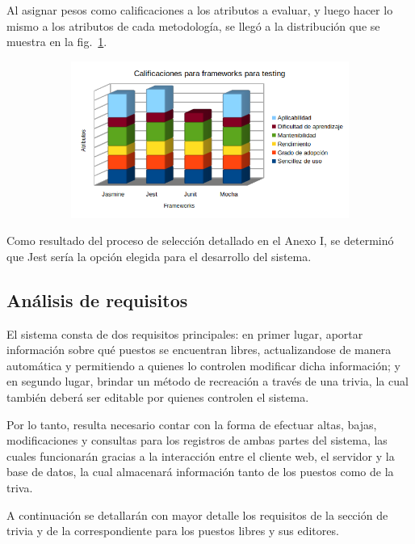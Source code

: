 \documentclass{article}
\begin{document}
Al asignar pesos como calificaciones a los atributos a evaluar, y luego hacer lo mismo a los atributos de cada metodología, se llegó a la distribución que se muestra en la fig.~\ref{fig:testing}.
\begin{figure}[H]
	\caption{Calificaciones para frameworks para testing}
    \begin{subfigure}{1\textwidth}
	\includegraphics[width=1\textwidth]{calificaciones para frameworks para testing.png}
    \end{subfigure}
	\label{fig:testing}
\end{figure}
\vspace{-1.0\baselineskip}
Como resultado del proceso de selección detallado en el Anexo I, se determinó que Jest sería la opción elegida para el desarrollo del sistema.
\subsection{Análisis de requisitos}
El sistema consta de dos requisitos principales: en primer lugar, aportar información sobre qué puestos se encuentran libres, actualizandose de manera automática y permitiendo a quienes lo controlen modificar dicha información; y en segundo lugar, brindar un método de recreación a través de una trivia, la cual también deberá ser editable por quienes controlen el sistema.

Por lo tanto, resulta necesario contar con la forma de efectuar altas, bajas, modificaciones y consultas para los registros de ambas partes del sistema, las cuales funcionarán gracias a la interacción entre el cliente web, el servidor y la base de datos, la cual almacenará información tanto de los puestos como de la triva.

A continuación se detallarán con mayor detalle los requisitos de la sección de trivia y de la correspondiente para los puestos libres y sus editores.
\end{document}
